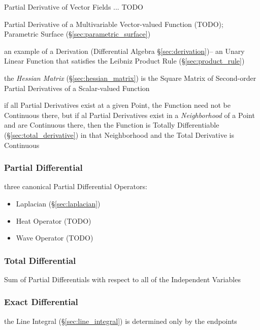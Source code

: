 Partial Derivative of Vector Fields ... TODO

Partial Derivative of a Multivariable Vector-valued Function (TODO); Parametric
Surface (\S\ref{sec:parametric_surface})

an example of a Derivation (Differential Algebra \S\ref{sec:derivation})-- an
Unary Linear Function that satisfies the Leibniz Product Rule
(\S\ref{sec:product_rule})

the \emph{Hessian Matrix} (\S\ref{sec:hessian_matrix}) is the Square Matrix of
Second-order Partial Derivatives of a Scalar-valued Function

if all Partial Derivatives exist at a given Point, the Function need not be
Continuous there, but if al Partial Derivatives exist in a \emph{Neighborhood}
of a Point and are Continuous there, then the Function is Totally Differentiable
(\S\ref{sec:total_derivative}) in that Neighborhood and the Total Derivative is
Continuous



\subsubsection{Partial Differential}\label{sec:partial_differential}

three canonical Partial Differential Operators:
\begin{itemize}
  \item Laplacian (\S\ref{sec:laplacian})
  \item Heat Operator (TODO)
  \item Wave Operator (TODO)
\end{itemize}



\subsubsection{Total Differential}\label{sec:total_differential}

Sum of Partial Differentials with respect to all of the Independent
Variables



\subsubsection{Exact Differential}\label{sec:exact_differential}

the Line Integral (\S\ref{sec:line_integral}) is determined only by the
endpoints



